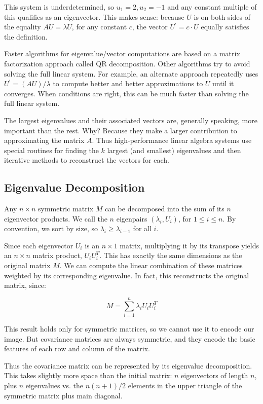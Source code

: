 \documentclass[10pt]{article}
\begin{document}
This system is underdetermined, so \(u_{1}=2, u_{2}=-1\) and any constant multiple of this qualifies as an eigenvector. This makes sense: because \(U\) is on both sides of the equality \(AU=\lambda U\), for any constant \(c\), the vector \(U^{\prime}=c \cdot U\) equally satisfies the definition.

Faster algorithms for eigenvalue/vector computations are based on a matrix factorization approach called QR decomposition. Other algorithms try to avoid solving the full linear system. For example, an alternate approach repeatedly uses \(U^{\prime}=(AU) / \lambda\) to compute better and better approximations to \(U\) until it converges. When conditions are right, this can be much faster than solving the full linear system.

The largest eigenvalues and their associated vectors are, generally speaking, more important than the rest. Why? Because they make a larger contribution to approximating the matrix \(A\). Thus high-performance linear algebra systems use special routines for finding the \(k\) largest (and smallest) eigenvalues and then iterative methods to reconstruct the vectors for each.

\subsection*{Eigenvalue Decomposition}
Any \(n \times n\) symmetric matrix \(M\) can be decomposed into the sum of its \(n\) eigenvector products. We call the \(n\) eigenpairs \((\lambda_{i}, U_{i})\), for \(1 \leq i \leq n\). By convention, we sort by size, so \(\lambda_{i} \geq \lambda_{i-1}\) for all \(i\).

Since each eigenvector \(U_{i}\) is an \(n \times 1\) matrix, multiplying it by its transpose yields an \(n \times n\) matrix product, \(U_{i} U_{i}^{T}\). This has exactly the same dimensions as the original matrix \(M\). We can compute the linear combination of these matrices weighted by its corresponding eigenvalue. In fact, this reconstructs the original matrix, since:

\[
M=\sum_{i=1}^{n} \lambda_{i} U_{i} U_{i}^{T}
\]

This result holds only for symmetric matrices, so we cannot use it to encode our image. But covariance matrices are always symmetric, and they encode the basic features of each row and column of the matrix.

Thus the covariance matrix can be represented by its eigenvalue decomposition. This takes slightly more space than the initial matrix: \(n\) eigenvectors of length \(n\), plus \(n\) eigenvalues vs. the \(n(n+1) / 2\) elements in the upper triangle of the symmetric matrix plus main diagonal.
\end{document}
